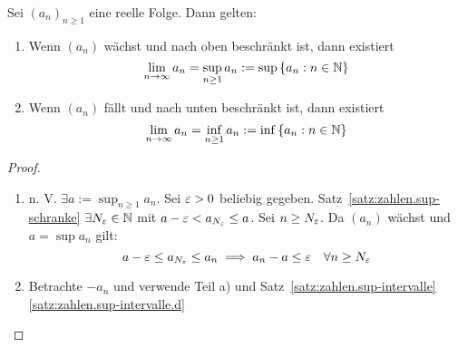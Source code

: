 \documentclass[12pt]{scrreprt}
\begin{document}
\begin{thm}
  \label{thm:konv.mon-beschr}
  Sei $(a_n)_{n\ge1}$ eine reelle Folge. Dann gelten:
  \begin{enumerate}
  \item Wenn $(a_n)$ wächst und nach oben beschränkt ist, dann
    existiert
    \[\lim_{n\rightarrow\infty}{a_n}=\sup_{n\ge1}{a_n}:=\sup{\{a_n:\ensuremath{n\in\mathbb{N}}\}}\]
    \label{thm:konv.mon-beschr.a}
  \item Wenn $(a_n)$ fällt und nach unten beschränkt ist, dann
    existiert
    \[\lim_{n\rightarrow\infty}{a_n}=\inf_{n\ge1}{a_n}:=\inf{\{a_n:\ensuremath{n\in\mathbb{N}}\}}\]
    \label{thm:konv.mon-beschr.b}
  \end{enumerate}
\end{thm}
\begin{proof}
  \begin{enumerate}
  \item n. V. $\exists a:=\sup_{n\ge1}{a_n}$. Sei $\varepsilon>0$ beliebig
    gegeben. Satz~\ref{satz:zahlen.sup-schranke} \folgt $\exists
    N_\varepsilon\in\mathbb{N}$ mit $a-\varepsilon < a_{N_\varepsilon}\le a$. Sei $n\ge N_\varepsilon$. Da
    $(a_n)$ wächst und $a=\sup{a_n}$ gilt:
    \[a-\varepsilon \le a_{N_\varepsilon} \le a_n \implies a_n-a \le \varepsilon \quad \forall
    n\ge N_\varepsilon\]
  \item Betrachte $-a_n$ und verwende Teil a) und
    Satz~\ref{satz:zahlen.sup-intervalle}\ref{satz:zahlen.sup-intervalle.d}
  \end{enumerate}
\end{proof}
\end{document}
